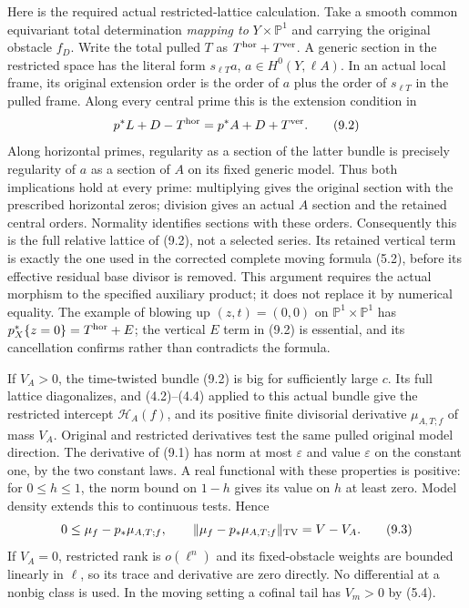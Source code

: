 \documentclass[10pt]{article}
\begin{document}
Here is the required actual restricted-lattice calculation. Take a smooth
common equivariant total determination \emph{mapping to}
$Y\times\mathbb P^1$ and carrying the original obstacle $f_D$.
Write the total pulled $T$ as $T^{\rm hor}+T^{\rm ver}$. A generic
section in the restricted space has the literal form $s_{\ell T}a$,
$a\in H^0(Y,\ell A)$. In an actual local frame, its original extension
order is the order of $a$ plus the order of $s_{\ell T}$ in the pulled
frame. Along every central prime this is the extension condition in
\[
 p^*L+D-T^{\rm hor}=p^*A+D+T^{\rm ver}.
 \tag{9.2}
\]
Along horizontal primes, regularity as a section of the latter bundle
is precisely regularity of $a$ as a section of $A$ on its fixed generic
model. Thus both implications hold at every prime: multiplying gives
the original section with the prescribed horizontal zeros; division
gives an actual $A$ section and the retained central orders.
Normality identifies sections with these orders. Consequently this is
the full relative lattice of (9.2), not a selected series. Its retained
vertical term is exactly the one used in the corrected complete moving
formula (5.2), before its effective residual base divisor is removed. This argument
requires the actual morphism to the specified auxiliary product; it
does not replace it by numerical equality. The example of blowing up
$(z,t)=(0,0)$ on $\mathbb P^1\times\mathbb P^1$ has
$p_X^*\{z=0\}=T^{\rm hor}+E$; the vertical $E$ term in (9.2)
is essential, and its cancellation confirms rather than contradicts
the formula.

If $V_A>0$, the time-twisted bundle (9.2) is big for sufficiently
large $c$. Its full lattice diagonalizes, and (4.2)--(4.4) applied to
this actual bundle give the restricted intercept $\mathscr H_A(f)$,
and its positive finite divisorial derivative $\mu_{A,T;f}$ of mass
$V_A$. Original and restricted derivatives test the same pulled original
model direction. The derivative of (9.1) has norm at most $\varepsilon$
and value $\varepsilon$ on the constant one, by the two constant laws.
A real functional with these properties is positive: for $0\leq h\leq1$,
the norm bound on $1-h$ gives its value on $h$ at least zero.
Model density extends this to continuous tests. Hence
\[
 0\leq\mu_f-p_*\mu_{A,T;f},\qquad
 \|\mu_f-p_*\mu_{A,T;f}\|_{\rm TV}=V-V_A.
 \tag{9.3}
\]
If $V_A=0$, restricted rank is $o(\ell^n)$ and its fixed-obstacle
weights are bounded linearly in $\ell$, so its trace and derivative
are zero directly. No differential at a nonbig class is used. In the
moving setting a cofinal tail has $V_m>0$ by (5.4).
\end{document}
